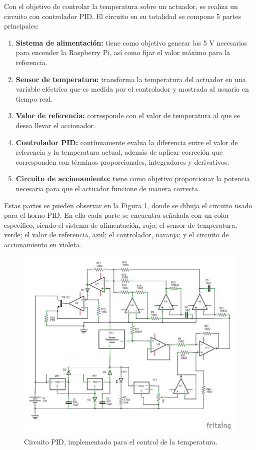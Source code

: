 \documentclass{wileysix}
\begin{document}
Con el objetivo de controlar la temperatura sobre un actuador, se realiza un circuito con controlador PID. El circuito en su totalidad se compone 5 partes principales:
\begin{enumerate}
	\item \textbf{Sistema de alimentaci\'on:} tiene como objetivo generar los 5 V necesarios para encender la Raspberry Pi, as\'i como fijar el valor m\'aximo para la referencia.
	\item \textbf{Sensor de temperatura:} transforma la temperatura del actuador en una variable el\'ectrica que es medida por el controlador y mostrada al usuario en tiempo real. 
	\item \textbf{Valor de referencia:} corresponde con el valor de temperatura al que se desea llevar el accionador.
	\item \textbf{Controlador PID:} cont\'inuamente evalua la diferencia entre el valor de referencia y la temperatura actual, adem\'as de aplicar correci\'on que corresponden con t\'erminos proporcionales, integradores y derivativos.
	\item \textbf{Circuito de accionamiento:} tiene como objetivo proporcionar la potencia necesaria para que el actuador funcione de manera correcta.
\end{enumerate}

Estas partes se pueden observar en la Figura \ref{fig: circuito}, donde se dibuja el circuito usado para el horno PID. En ella cada parte se encuentra se\~nalada con un color espec\'ifico, siendo el sistema de alimentaci\'on, rojo; el sensor de temperatura, verde; el valor de referencia, azul; el controlador, naranja; y el circuito de accionamiento en violeta. 
\begin{figure}[h]
	\centering
	\includegraphics[width=0.9\linewidth]{extras/circuit_schem.pdf}
	\caption{Circuito PID, implementado para el control de la temperatura.}
	\label{fig: circuito}
\end{figure}
\end{document}
